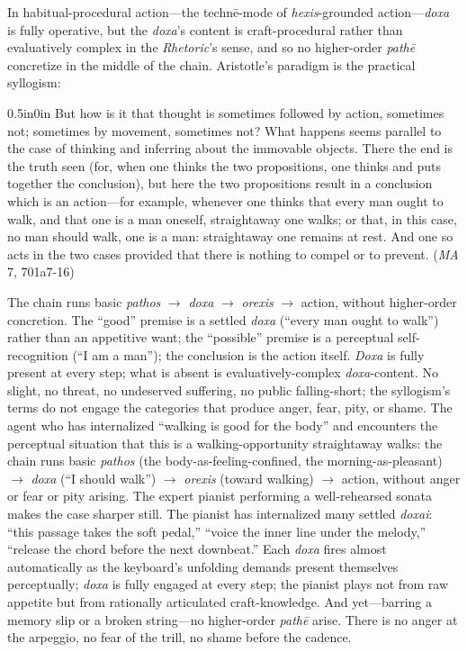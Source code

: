 In habitual-procedural action---the technē-mode of \textit{hexis}-grounded action---\textit{doxa} is fully operative, but the \textit{doxa}'s content is craft-procedural rather than evaluatively complex in the \textit{Rhetoric}'s sense, and so no higher-order \textit{pathē} concretize in the middle of the chain. Aristotle's paradigm is the practical syllogism:
\begin{adjustwidth}{0.5in}{0in}
But how is it that thought is sometimes followed by action, sometimes not; sometimes by movement, sometimes not? What happens seems parallel to the case of thinking and inferring about the immovable objects. There the end is the truth seen (for, when one thinks the two propositions, one thinks and puts together the conclusion), but here the two propositions result in a conclusion which is an action---for example, whenever one thinks that every man ought to walk, and that one is a man oneself, straightaway one walks; or that, in this case, no man should walk, one is a man: straightaway one remains at rest. And one so acts in the two cases provided that there is nothing to compel or to prevent. (\textit{MA} 7, 701a7-16)
\end{adjustwidth}
The chain runs basic \textit{pathos} $\rightarrow$ \textit{doxa} $\rightarrow$ \textit{orexis} $\rightarrow$ action, without higher-order concretion. The ``good'' premise is a settled \textit{doxa} (``every man ought to walk'') rather than an appetitive want; the ``possible'' premise is a perceptual self-recognition (``I am a man''); the conclusion is the action itself. \textit{Doxa} is fully present at every step; what is absent is evaluatively-complex \textit{doxa}-content. No slight, no threat, no undeserved suffering, no public falling-short; the syllogism's terms do not engage the categories that produce anger, fear, pity, or shame. The agent who has internalized ``walking is good for the body'' and encounters the perceptual situation that this is a walking-opportunity straightaway walks: the chain runs basic \textit{pathos} (the body-as-feeling-confined, the morning-as-pleasant) $\rightarrow$ \textit{doxa} (``I should walk'') $\rightarrow$ \textit{orexis} (toward walking) $\rightarrow$ action, without anger or fear or pity arising. The expert pianist performing a well-rehearsed sonata makes the case sharper still. The pianist has internalized many settled \textit{doxai}: ``this passage takes the soft pedal,'' ``voice the inner line under the melody,'' ``release the chord before the next downbeat.'' Each \textit{doxa} fires almost automatically as the keyboard's unfolding demands present themselves perceptually; \textit{doxa} is fully engaged at every step; the pianist plays not from raw appetite but from rationally articulated craft-knowledge. And yet---barring a memory slip or a broken string---no higher-order \textit{pathē} arise. There is no anger at the arpeggio, no fear of the trill, no shame before the cadence.

